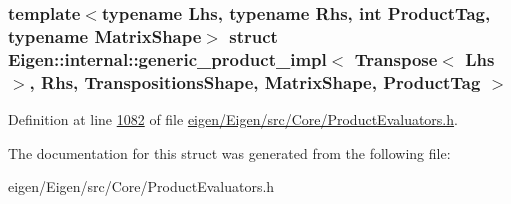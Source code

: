 \subsubsection*{template$<$typename Lhs, typename Rhs, int Product\+Tag, typename Matrix\+Shape$>$\newline
struct Eigen\+::internal\+::generic\+\_\+product\+\_\+impl$<$ Transpose$<$ Lhs $>$, Rhs, Transpositions\+Shape, Matrix\+Shape, Product\+Tag $>$}



Definition at line \hyperlink{eigen_2_eigen_2src_2_core_2_product_evaluators_8h_source_l01082}{1082} of file \hyperlink{eigen_2_eigen_2src_2_core_2_product_evaluators_8h_source}{eigen/\+Eigen/src/\+Core/\+Product\+Evaluators.\+h}.



The documentation for this struct was generated from the following file\+:\begin{DoxyCompactItemize}
\item 
eigen/\+Eigen/src/\+Core/\+Product\+Evaluators.\+h\end{DoxyCompactItemize}
